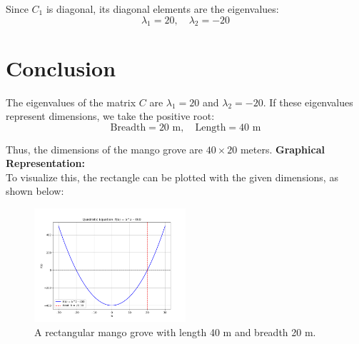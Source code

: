 \documentclass[journal]{IEEEtran}
\begin{document}
Since $C_1$ is diagonal, its diagonal elements are the eigenvalues:
\begin{equation}
    \lambda_1 = 20, \quad \lambda_2 = -20
\end{equation}

\section{Conclusion}
The eigenvalues of the matrix $C$ are $\lambda_1 = 20$ and $\lambda_2 = -20$. 
If these eigenvalues represent dimensions, we take the positive root:
\begin{equation}
    \text{Breadth} = 20\text{ m}, \quad \text{Length} = 40\text{ m}
\end{equation}

Thus, the dimensions of the mango grove are $40 \times 20$ meters.
\textbf{Graphical Representation:}\\
To visualize this, the rectangle can be plotted with the given dimensions, as shown below:
\begin{figure}[ht] %
    \centering
    \includegraphics[width=0.5\textwidth]{figs/Figure_1.png} %
    \caption{A rectangular mango grove with length 40 m and breadth 20 m.}
    \label{fig:mango_grove}
\end{figure}
\end{document}

